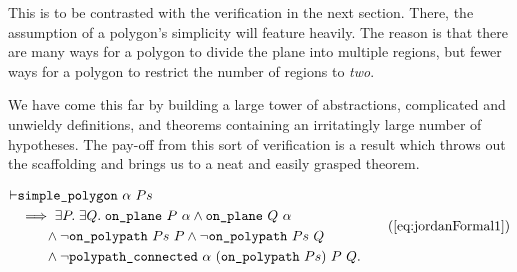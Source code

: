 This is to be contrasted with the verification in the next section. There, the assumption of a polygon's simplicity will feature heavily. The reason is that there are many ways for a polygon to divide the plane into multiple regions, but fewer ways for a polygon to restrict the number of regions to \emph{two}.

We have come this far by building a large tower of abstractions, complicated and unwieldy definitions, and theorems containing an irritatingly large number of hypotheses. The pay-off from this sort of verification is a result which throws out the scaffolding and brings us to a neat and easily grasped theorem.

\begin{equation}
  \begin{split}
    \vdash&\code{simple\_polygon}\ \alpha\ Ps\\
    &\implies \exists P.\;\exists Q.\; \code{on\_plane}\ P\ \alpha \wedge \code{on\_plane}\ Q\ \alpha\\
    &\qquad\wedge \neg\code{on\_polypath}\ Ps\ P \wedge \neg\code{on\_polypath}\ Ps\ Q\\
    &\qquad\wedge \neg\code{polypath\_connected}\ \alpha\ (\code{on\_polypath}\ Ps)\ P\ Q.
  \end{split}\tag{\ref{eq:jordanFormal1}}
\end{equation}

